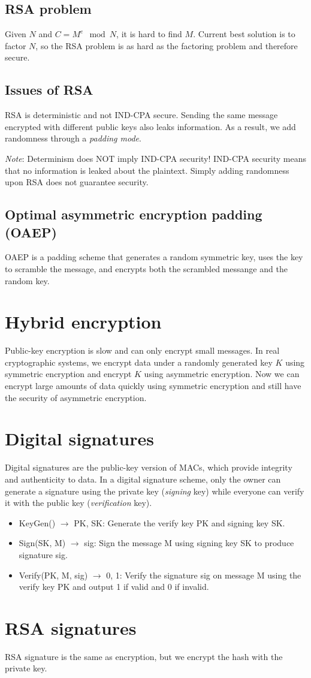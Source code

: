 \subsection{RSA problem}
Given $N$ and $C=M^e \mod{N}$, it is hard to find $M$. Current best solution is to factor $N$, so the RSA problem is as hard as the factoring problem and therefore secure.

\subsection{Issues of RSA}
RSA is deterministic and not IND-CPA secure.  Sending the same message encrypted with different public keys also leaks information. As a result, we add randomness through a \emph{padding mode}.

\medskip
\emph{Note}: Determinism does NOT imply IND-CPA security! IND-CPA security means that no information is leaked about the plaintext. Simply adding randomness upon RSA does not guarantee security.

\subsection{Optimal asymmetric encryption padding (OAEP)}
OAEP is a padding scheme that generates a random symmetric key, uses the key to scramble the message, and encrypts both the scrambled messange and the random key. 

\section{Hybrid encryption}
Public-key encryption is slow and can only encrypt small messages. In real cryptographic systems, we encrypt data under a randomly generated key $K$ using symmetric encryption and encrypt $K$ using asymmetric encryption. Now we can encrypt large amounts of data quickly using symmetric encryption and still have the security of asymmetric encryption.

\section{Digital signatures}
Digital signatures are the public-key version of MACs, which provide integrity and authenticity to data. In a digital signature scheme, only the owner can generate a signature using the private key (\emph{signing} key) while everyone can verify it with the public key (\emph{verification} key).

\begin{itemize}
    \item KeyGen() $\rightarrow$ PK, SK: Generate the verify key PK and signing key SK.
    \item Sign(SK, M) $\rightarrow$ sig: Sign the message M using signing key SK to produce signature sig.
    \item Verify(PK, M, sig) $\rightarrow$ {0, 1}: Verify the signature sig on message M using the verify key PK and output 1 if valid and 0 if invalid.
\end{itemize}

\section{RSA signatures}
RSA signature is the same as encryption, but we encrypt the hash with the private key.